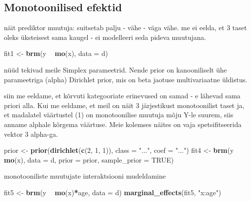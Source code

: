 \documentclass[]{article}
\newenvironment{Shaded}{\begin{snugshade}}{\end{snugshade}}
\newcommand{\KeywordTok}[1]{\textcolor[rgb]{0.13,0.29,0.53}{\textbf{#1}}}
\newcommand{\DataTypeTok}[1]{\textcolor[rgb]{0.13,0.29,0.53}{#1}}
\newcommand{\DecValTok}[1]{\textcolor[rgb]{0.00,0.00,0.81}{#1}}
\newcommand{\StringTok}[1]{\textcolor[rgb]{0.31,0.60,0.02}{#1}}
\newcommand{\OtherTok}[1]{\textcolor[rgb]{0.56,0.35,0.01}{#1}}
\newcommand{\OperatorTok}[1]{\textcolor[rgb]{0.81,0.36,0.00}{\textbf{#1}}}
\newcommand{\NormalTok}[1]{#1}
\begin{document}
\subsection{Monotoonilised efektid}\label{monotoonilised-efektid}

näit prediktor muutuja: suitsetab palju - vähe - väga vähe. me ei eelda,
et 3 taset oleks üksteisest sama kaugel - ei modelleeri seda pideva
muutujana.

\begin{Shaded}
\begin{Highlighting}[]
\NormalTok{fit1 <-}\StringTok{ }\KeywordTok{brm}\NormalTok{(y }\OperatorTok{~}\StringTok{ }\KeywordTok{mo}\NormalTok{(x), }\DataTypeTok{data =}\NormalTok{ d)}
\end{Highlighting}
\end{Shaded}

nüüd tekivad meile Simplex parameetrid. Nende prior on kanooniliselt ühe
parameetriga (alpha) Dirichlet prior, mis on beta jaotuse multivariaatne
üldistus.

siin me eeldame, et kõrvuti kategooriate erinevused on samad - e lähevad
sama priori alla. Kui me eeldame, et meil on näit 3 järjestikust
monotoonilist taset ja, et madalatel väärtustel (1) on monotoonilise
muutuja mõju Y-le suurem, siis anname alphale kõrgema väärtuse. Meie
kolemses näites on vaja spetsifitseerida vektor 3 alpha-ga.

\begin{Shaded}
\begin{Highlighting}[]
\NormalTok{prior <-}\StringTok{ }\KeywordTok{prior}\NormalTok{(}\KeywordTok{dirichlet}\NormalTok{(}\KeywordTok{c}\NormalTok{(}\DecValTok{2}\NormalTok{, }\DecValTok{1}\NormalTok{, }\DecValTok{1}\NormalTok{)), }\DataTypeTok{class =} \StringTok{"..."}\NormalTok{, }\DataTypeTok{coef =} \StringTok{"..."}\NormalTok{)}
\NormalTok{fit4 <-}\StringTok{ }\KeywordTok{brm}\NormalTok{(y }\OperatorTok{~}\StringTok{ }\KeywordTok{mo}\NormalTok{(x), }\DataTypeTok{data =}\NormalTok{ d,}
            \DataTypeTok{prior =}\NormalTok{ prior, }\DataTypeTok{sample_prior =} \OtherTok{TRUE}\NormalTok{)}
\end{Highlighting}
\end{Shaded}

monotooniliste muutujate interaktsiooni mudeldamine

\begin{Shaded}
\begin{Highlighting}[]
\NormalTok{fit5 <-}\StringTok{ }\KeywordTok{brm}\NormalTok{(y }\OperatorTok{~}\StringTok{ }\KeywordTok{mo}\NormalTok{(x)}\OperatorTok{*}\NormalTok{age, }\DataTypeTok{data =}\NormalTok{ d)}
\KeywordTok{marginal_effects}\NormalTok{(fit5, }\StringTok{"x:age"}\NormalTok{)}
\end{Highlighting}
\end{Shaded}
\end{document}
